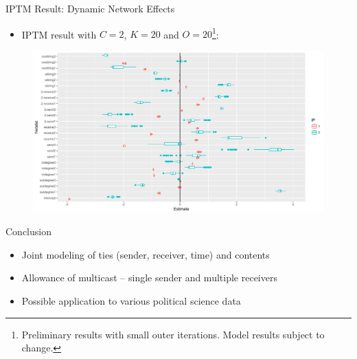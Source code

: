 \documentclass[10pt]{beamer}
\def\bni{\begin{itemize}} \def\ei{\end{itemize}}
\theoremstyle{definition}
\theoremstyle{remark}
\begin{document}
\begin{frame}{IPTM Result: Dynamic Network Effects}
	\bni \item IPTM result with $C=2$, $K=20$ and $O= 20$\footnote{Preliminary results with small outer iterations. Model results subject to change.}:
	\ei
	\begin{figure}
		\includegraphics[width=1\textwidth]{figures/DareBplot.pdf}
	\end{figure}	
\end{frame}
\begin{frame}{Conclusion}
 \bni
 \item Joint modeling of ties (sender, receiver, time) and contents
 	\vspace{0.4cm}
 \item Allowance of multicast -- single sender and multiple receivers
 	\vspace{0.4cm}
 \item Possible application to various political science data
 \ei
\end{frame}
\end{document}
